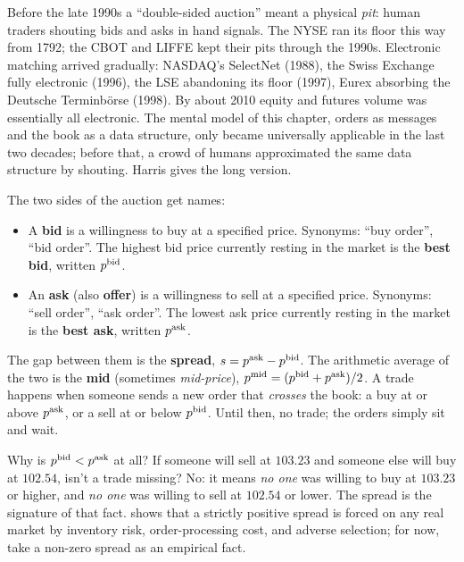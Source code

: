 \begin{historybox}
Before the late 1990s a ``double-sided auction'' meant a physical
\emph{pit}: human traders shouting bids and asks in hand signals.
The NYSE ran its floor this way from 1792; the CBOT and LIFFE kept
their pits through the 1990s. Electronic matching arrived gradually:
NASDAQ's SelectNet (1988), the Swiss Exchange fully electronic
(1996), the LSE abandoning its floor (1997), Eurex absorbing the
Deutsche Terminb\"orse (1998). By about 2010 equity and
futures volume was essentially all electronic. The mental model of
this chapter, orders as messages and the book as a data structure,
only became universally applicable in the last two decades; before
that, a crowd of humans approximated the same data structure by
shouting. Harris \citeHarris{} gives the long version.
\end{historybox}

The two sides of the auction get names:

\begin{itemize}
  \item A \textbf{bid} is a willingness to buy at a specified price.
  Synonyms: ``buy order'', ``bid order''. The highest bid price
  currently resting in the market is the \textbf{best bid}, written
  $p^{\mathrm{bid}}$.
  \item An \textbf{ask} (also \textbf{offer}) is a willingness to sell
  at a specified price. Synonyms: ``sell order'', ``ask order''. The
  lowest ask price currently resting in the market is the
  \textbf{best ask}, written $p^{\mathrm{ask}}$.
\end{itemize}

The gap between them is the \textbf{spread}, $s = p^{\mathrm{ask}} -
p^{\mathrm{bid}}$. The arithmetic average of the two is the \textbf{mid}
(sometimes \emph{mid-price}), $p^{\mathrm{mid}} = (p^{\mathrm{bid}} + p^{\mathrm{ask}})/2$. A trade
happens when someone sends a new order that \emph{crosses} the book:
a buy at or above $p^{\mathrm{ask}}$, or a sell at or below $p^{\mathrm{bid}}$. Until then,
no trade; the orders simply sit and wait.

Why is $p^{\mathrm{bid}} < p^{\mathrm{ask}}$ at all? If someone will sell at $103.23$ and
someone else will buy at $102.54$, isn't a trade missing? No: it
means \emph{no one} was willing to buy at $103.23$ or higher, and
\emph{no one} was willing to sell at $102.54$ or lower. The spread is
the signature of that fact.  shows that a
strictly positive spread is forced on any real market by inventory
risk, order-processing cost, and adverse selection; for now, take a
non-zero spread as an empirical fact.


